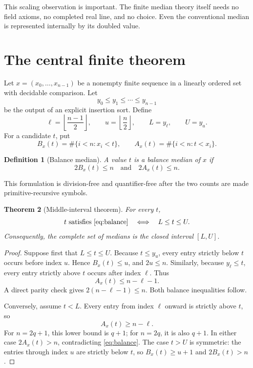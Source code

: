 \documentclass[11pt]{article}
\newtheorem{theorem}{Theorem}[section]
\newtheorem{definition}[theorem]{Definition}
\newcommand{\floor}[1]{\left\lfloor#1\right\rfloor}
\begin{document}
This scaling observation is important.  The finite median theory itself needs
no field axioms, no completed real line, and no choice.  Even the conventional
median is represented internally by its doubled value.

\section{The central finite theorem}

Let $x=(x_0,\ldots,x_{n-1})$ be a nonempty finite sequence in a linearly
ordered set with decidable comparison.  Let
\[
  y_0\leq y_1\leq\cdots\leq y_{n-1}
\]
be the output of an explicit insertion sort.  Define
\[
 \ell=\floor{\frac{n-1}{2}},\qquad
 u=\floor{\frac n2},\qquad L=y_\ell,\qquad U=y_u.
\]
For a candidate $t$, put
\[
 B_x(t)=\#\{i<n:x_i<t\},\qquad
 A_x(t)=\#\{i<n:t<x_i\}.
\]

\begin{definition}[Balance median]
A value $t$ is a balance median of $x$ if
\begin{equation}\label{eq:balance}
  2B_x(t)\leq n\quad\text{and}\quad 2A_x(t)\leq n.
\end{equation}
\end{definition}

This formulation is division-free and quantifier-free after the two counts
are made primitive-recursive symbols.

\begin{theorem}[Middle-interval theorem]\label{thm:middle-interval}
For every $t$,
\[
 t\text{ satisfies \eqref{eq:balance}}
 \quad\Longleftrightarrow\quad L\leq t\leq U.
\]
Consequently, the complete set of medians is the closed interval $[L,U]$.
\end{theorem}

\begin{proof}
Suppose first that $L\leq t\leq U$.  Because $t\leq y_u$, every entry strictly
below $t$ occurs before index $u$.  Hence $B_x(t)\leq u$, and
$2u\leq n$.  Similarly, because $y_\ell\leq t$, every entry strictly above
$t$ occurs after index $\ell$.  Thus
\[
 A_x(t)\leq n-\ell-1.
\]
A direct parity check gives $2(n-\ell-1)\leq n$.  Both balance inequalities
follow.

Conversely, assume $t<L$.  Every entry from index $\ell$ onward is strictly
above $t$, so
\[
 A_x(t)\geq n-\ell.
\]
For $n=2q+1$, this lower bound is $q+1$; for $n=2q$, it is also $q+1$.
In either case $2A_x(t)>n$, contradicting \eqref{eq:balance}.  The case $t>U$
is symmetric: the entries through index $u$ are strictly below $t$, so
$B_x(t)\geq u+1$ and $2B_x(t)>n$.
\end{proof}
\end{document}
